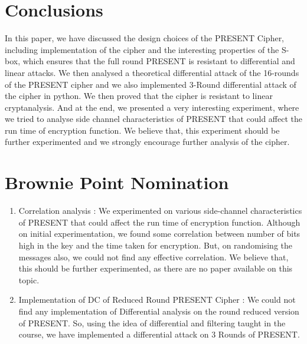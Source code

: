 \documentclass[preprint]{transcrypto}
\begin{document}
\section{Conclusions}
In this paper, we have discussed the design choices of the PRESENT Cipher, including implementation of the cipher and the interesting properties of the S-box, which ensures that the full round PRESENT is resistant to differential and linear attacks. We then analysed a theoretical differential attack of the 16-rounds of the PRESENT cipher and we also implemented 3-Round differential attack of the cipher in python. We then proved that the cipher is resistant to linear cryptanalysis. And at the end, we presented a very interesting experiment, where we tried to analyse side channel characteristics of PRESENT that could affect the run time of encryption function. We believe that, this experiment should be further experimented and we strongly encourage further analysis of the cipher. 
\section{Brownie Point Nomination}
\begin{enumerate}
    \item Correlation analysis : We experimented on various side-channel characteristics of PRESENT that could affect the run time of encryption function. Although on initial experimentation, we found some correlation between number of bits high in the key and the time taken for encryption. But, on randomising the messages also, we could not find any effective correlation. We believe that, this should be further experimented, as there are no paper available on this topic.
    \item Implementation of DC of Reduced Round PRESENT Cipher : We could not find any implementation of Differential analysis on the round reduced version of PRESENT. So, using the idea of differential and filtering taught in the course, we have implemented a differential attack on 3 Rounds of PRESENT. 
\end{enumerate}
\end{document}
